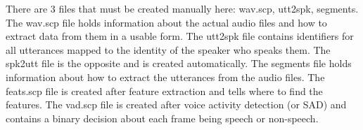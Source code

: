 	There are 3 files that must be created manually here: wav.scp, utt2spk, segments. The wav.scp file holds information about the actual audio files and how to extract data from them in a usable form. The utt2spk file contains identifiers for all utterances mapped to the identity of the speaker who speaks them. The spk2utt file is the opposite and is created automatically. The segments file holds information about how to extract the utterances from the audio files. The feats.scp file is created after feature extraction and tells where to find the features. The vad.scp file is created after voice activity detection (or SAD) and contains a binary decision about each frame being speech or non-speech.
	